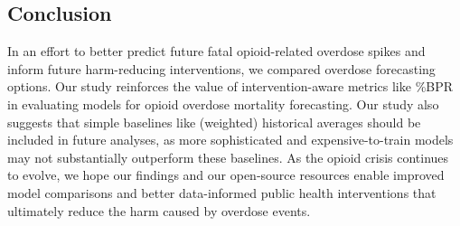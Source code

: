 \subsection{Conclusion}\label{conclusion}

In an effort to better predict future fatal opioid-related overdose spikes and inform future harm-reducing interventions, we compared overdose forecasting options. Our study reinforces the value of intervention-aware metrics like \%BPR in evaluating models for opioid overdose mortality forecasting. Our study also suggests that simple baselines like (weighted) historical averages should be included in future analyses, as more sophisticated and expensive-to-train models may not substantially outperform these baselines. As the opioid crisis continues to evolve, we hope our findings and our open-source resources enable improved model comparisons and better data-informed public health interventions that ultimately reduce the harm caused by overdose events.
